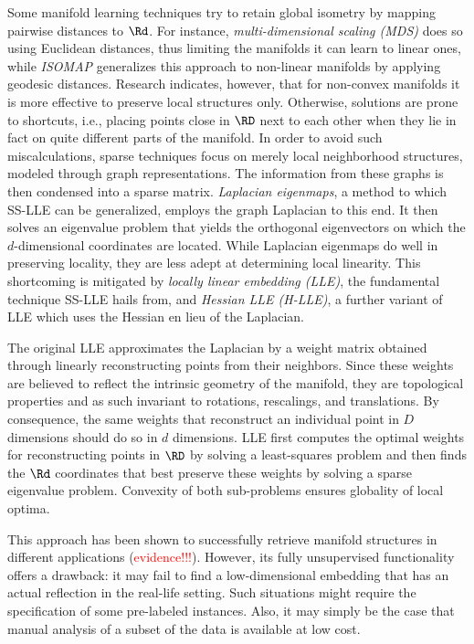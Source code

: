 Some manifold learning techniques try to retain global isometry by mapping
pairwise distances to $\Rd$.
For instance, \textit{multi-dimensional scaling (MDS)} does so using Euclidean
distances, thus limiting the manifolds it can learn to linear ones, while 
\textit{ISOMAP} generalizes this approach to non-linear manifolds by applying 
geodesic distances.
Research indicates, however, that for non-convex manifolds it is more effective 
to preserve local structures only.
Otherwise, solutions are prone to shortcuts, i.e., placing points close in $\RD$
next to each other when they lie in fact on quite different parts of the 
manifold.
In order to avoid such miscalculations, sparse techniques focus on merely
local neighborhood structures, modeled through graph representations.
The information from these graphs is then condensed into a sparse matrix.
\textit{Laplacian eigenmaps}, a method to which SS-LLE can be generalized,
employs the graph Laplacian to this end.
It then solves an eigenvalue problem that yields the orthogonal eigenvectors on 
which the $d$-dimensional coordinates are located.
While Laplacian eigenmaps do well in preserving locality, they are less adept
at determining local linearity.
This shortcoming is mitigated by \textit{locally linear embedding (LLE)}, the
fundamental technique SS-LLE hails from, and \textit{Hessian LLE (H-LLE)}, 
a further variant of LLE which uses the Hessian en lieu of the Laplacian.

The original LLE approximates the Laplacian by a weight matrix obtained through 
linearly reconstructing points from their neighbors.
Since these weights are believed to reflect the intrinsic geometry of the 
manifold, they are topological properties and as such invariant to rotations, 
rescalings, and translations.
By consequence, the same weights that reconstruct an individual point in $D$
dimensions should do so in $d$ dimensions.
LLE first computes the optimal weights for reconstructing points in $\RD$ by
solving a least-squares problem and then finds the $\Rd$ coordinates that best
preserve these weights by solving a sparse eigenvalue problem.
Convexity of both sub-problems ensures globality of local optima.

This approach has been shown to successfully retrieve manifold structures in
different applications (\textcolor{red}{evidence!!!}).
However, its fully unsupervised functionality offers a drawback: it may fail
to find a low-dimensional embedding that has an actual reflection in the 
real-life setting.
Such situations might require the specification of some pre-labeled instances.
Also, it may simply be the case that manual analysis of a subset of the data 
is available at low cost.

